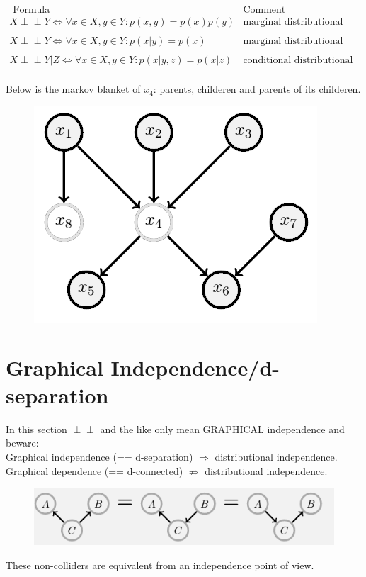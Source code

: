 \documentclass[a4paper,10pt]{article}
\newcommand{\negspace}{\!\!\!}
\newcommand{\idp}{\perp \negspace \perp}
\begin{document}
$$\begin{array}{l|c}
    \textrm{ Formula} & \textrm{Comment}  \\ 
    X \idp Y \iff  \forall x \in X, y \in Y : p(x,y) = p(x)p(y) & \textrm{marginal distributional independence for variable sets X,Y} \\
    \\
    X \idp Y \iff  \forall x \in X, y \in Y: p(x|y) = p(x) & \textrm{marginal distributional independence with CPD def.}\\
    \\
    X \idp Y | Z \iff  \forall x \in X, y \in Y : p(x|y,z) = p(x|z) & \textrm{conditional distributional independence.}\\
  \end{array}
$$

Below is the markov blanket of $x_4$: parents, childeren and parents of its childeren.
\begin{figure}[htb!]
\centering
\includegraphics[scale=0.3]{gmarkovblanky.png}
\end{figure}

\newpage
\section{Graphical Independence/d-separation}
In this section $\idp$ and the like only mean GRAPHICAL independence and beware:\\
Graphical independence (== d-separation) $\Rightarrow$ distributional independence. \\
Graphical dependence (== d-connected) $\not \Rightarrow$ distributional independence. 

\begin{figure}[htb!]
\centering
\includegraphics[scale=0.5]{gnoncollider.png}
\end{figure}
These non-colliders are equivalent from an independence point of view. 
\end{document}
